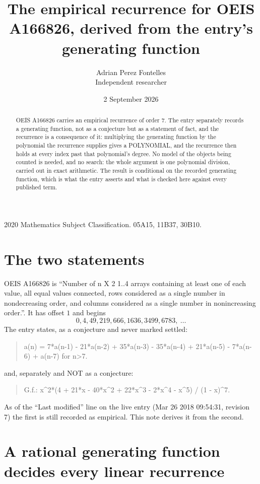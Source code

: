 \documentclass[11pt,a4paper]{article}
\title{The empirical recurrence for OEIS A166826, derived from the entry's generating function}
\author{Adrian Perez Fontelles\\ \small Independent researcher}
\date{2 September 2026}
\theoremstyle{plain}
\theoremstyle{definition}
\begin{document}
\maketitle

\begin{abstract}
OEIS A166826 carries an empirical recurrence of order $7$. The entry separately records a
generating function, not as a conjecture but as a statement of fact, and the recurrence is a
consequence of it: multiplying the generating function by the polynomial the recurrence
supplies gives a POLYNOMIAL, and the recurrence then holds at every index past that
polynomial's degree. No model of the objects being counted is needed, and no search: the
whole argument is one polynomial division, carried out in exact arithmetic. The result is
conditional on the recorded generating function, which is what the entry asserts and what is
checked here against every published term.
\end{abstract}

\noindent\small 2020 Mathematics Subject Classification. 05A15, 11B37, 30B10.\normalsize

\section{The two statements}

OEIS A166826 is ``Number of n X 2 1..4 arrays containing at least one of each value, all equal values connected, rows considered as a single number in nondecreasing order, and columns considered as a single number in nonincreasing order.''. It has offset $1$ and begins
\[
0, 4, 49, 219, 666, 1636, 3499, 6783,\ \dots
\]
The entry states, as a conjecture and never marked settled:
\begin{quote}
a(n) = 7*a(n-1) - 21*a(n-2) + 35*a(n-3) - 35*a(n-4) + 21*a(n-5) - 7*a(n-6) + a(n-7) for n>7.
\end{quote}
and, separately and NOT as a conjecture:
\begin{quote}
G.f.: x\^{}2*(4 + 21*x - 40*x\^{}2 + 22*x\^{}3 - 2*x\^{}4 - x\^{}5) / (1 - x)\^{}7.
\end{quote}
As of the ``Last modified'' line on the live entry (Mar 26 2018 09:54:31, revision 7) the first is still
recorded as empirical. This note derives it from the second.

\section{A rational generating function decides every linear recurrence}
\end{document}
